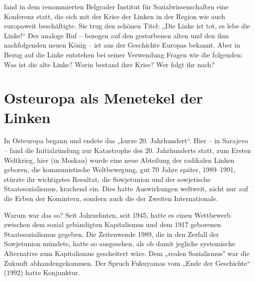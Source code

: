 
\begin{multicols*}{2}
     fand in dem renommierten Belgrader Institut für Sozialwissenschaften eine Konferenz statt, die sich mit der Krise der Linken in der Region wie auch europaweit beschäftigte.  Sie trug den schönen Titel: „Die Linke ist tot, es lebe die Linke!“ Der analoge Ruf – bezogen auf den gestorbenen alten und den ihm nachfolgenden neuen König – ist aus der Geschichte Europas bekannt. Aber in Bezug auf die Linke entstehen bei seiner Verwendung Fragen wie die folgenden: Was ist die alte Linke? Worin bestand ihre Krise? Wer folgt ihr nach? 

    \section{Osteuropa als Menetekel der Linken}

\noindent In Osteuropa begann und endete das „kurze 20. Jahrhundert“. Hier – in Sarajevo – fand die Initialzündung zur Katastrophe des 20. Jahrhunderts statt, zum Ersten Weltkrieg, hier (in Moskau) wurde eine neue Abteilung der radikalen Linken geboren, die kommunistische Weltbewegung, gut 70 Jahre später, 1989–1991, stürzte ihr wichtigstes Resultat, die Sowjetunion und der sowjetische Staatssozialismus, krachend ein. Dies hatte Auswirkungen weltweit, nicht nur auf die Erben der Komintern, sondern auch die der Zweiten Internationale.\par

Warum war das so? Seit Jahrzehnten, seit 1945, hatte es einen Wettbewerb zwischen dem sozial gebändigten Kapitalismus und dem 1917 geborenen Staatssozialismus gegeben. Die Zeitenwende 1989, die in den Zerfall der Sowjetunion mündete, hatte so ausgesehen, als ob damit jegliche systemische Alternative zum Kapitalismus gescheitert wäre. Dem „realen Sozialismus"  war die Zukunft abhandengekommen. Der Spruch Fukuyamas vom „Ende der Geschichte“ (1992) hatte Konjunktur. \par


\end{multicols*}
